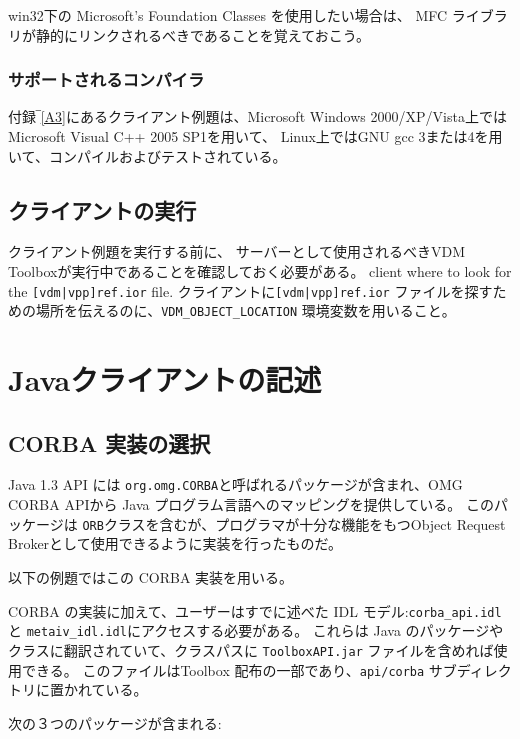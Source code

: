 \documentclass[\pformat,12pt]{jarticle}
\begin{document}
win32下の Microsoft's Foundation Classes を使用したい場合は、 MFC ライブラリが静的にリンクされるべきであることを覚えておこう。

\subsubsection{サポートされるコンパイラ}

付録‾\ref{A3}にあるクライアント例題は、Microsoft Windows 2000/XP/Vista上ではMicrosoft Visual C++ 2005 SP1を用いて、
Linux上ではGNU gcc 3または4を用いて、コンパイルおよびテストされている。

\subsection{クライアントの実行}

クライアント例題を実行する前に、 サーバーとして使用されるべきVDM Toolboxが実行中であることを確認しておく必要がある。
client where to look for the {\tt [vdm|vpp]ref.ior} file.
 クライアントに{\tt [vdm|vpp]ref.ior} ファイルを探すための場所を伝えるのに、{\tt  VDM\_OBJECT\_LOCATION} 環境変数を用いること。

\newpage
\section{Javaクライアントの記述}
\label{writingajavaclient}

\subsection{CORBA 実装の選択}

 Java 1.3 API には {\tt org.omg.CORBA}と呼ばれるパッケージが含まれ、OMG CORBA APIから Java プログラム言語へのマッピングを提供している。
このパッケージは {\tt ORB}クラスを含むが、プログラマが十分な機能をもつObject Request Brokerとして使用できるように実装を行ったものだ。 

以下の例題ではこの CORBA 実装を用いる。

 CORBA の実装に加えて、ユーザーはすでに述べた IDL モデル:{\tt corba\_api.idl} と {\tt  metaiv\_idl.idl}にアクセスする必要がある。
これらは Java のパッケージやクラスに翻訳されていて、クラスパスに {\tt ToolboxAPI.jar} ファイルを含めれば使用できる。
このファイルはToolbox 配布の一部であり、\verb+api/corba+ サブディレクトリに置かれている。

次の３つのパッケージが含まれる:
\end{document}
